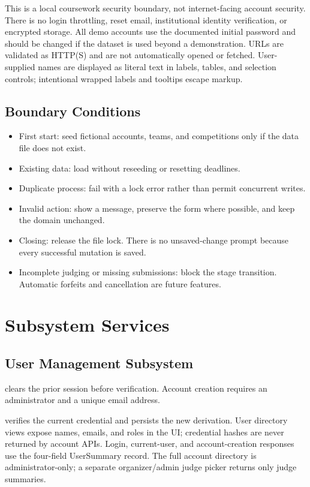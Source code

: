 This is a local coursework security boundary, not internet-facing account security. There is no login throttling, reset email, institutional identity verification, or encrypted storage. All demo accounts use the documented initial password and should be changed if the dataset is used beyond a demonstration. URLs are validated as HTTP(S) and are not automatically opened or fetched. User-supplied names are displayed as literal text in labels, tables, and selection controls; intentional wrapped labels and tooltips escape markup.
\subsection{Boundary Conditions}
\begin{itemize}
\item First start: seed fictional accounts, teams, and competitions only if the data file does not exist.
\item Existing data: load without reseeding or resetting deadlines.
\item Duplicate process: fail with a lock error rather than permit concurrent writes.
\item Invalid action: show a message, preserve the form where possible, and keep the domain unchanged.
\item Closing: release the file lock. There is no unsaved-change prompt because every successful mutation is saved.
\item Incomplete judging or missing submissions: block the stage transition. Automatic forfeits and cancellation are future features.
\end{itemize}

\clearpage\section{Subsystem Services}
\subsection{User Management Subsystem}
 clears the prior session before verification. Account creation requires an administrator and a unique email address.

 verifies the current credential and persists the new derivation. User directory views expose names, emails, and roles in the UI; credential hashes are never returned by account APIs. Login, current-user, and account-creation responses use the four-field UserSummary record. The full account directory is administrator-only; a separate organizer/admin judge picker returns only judge summaries.
